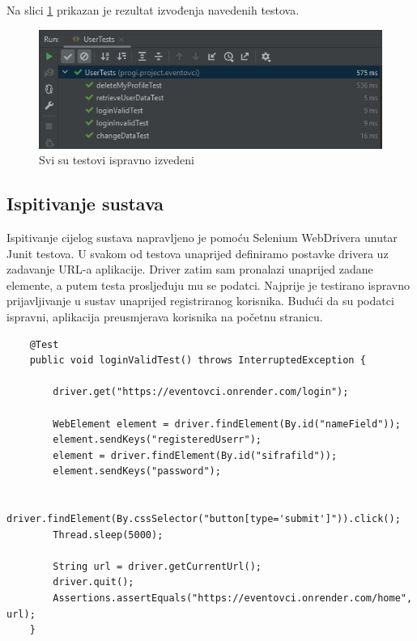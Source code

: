 			Na slici \ref{komp} prikazan je rezultat izvođenja navedenih testova. 
			
			\begin{figure}[H]
				\includegraphics[width=\textwidth]{slike/ispitivanje_komponenti.jpeg} 
				\centering
				\vspace{-0.2cm}
				\caption{Svi su testovi ispravno izvedeni}
				\label{komp}
			\end{figure}
			
			
			\subsection{Ispitivanje sustava}
			
			 Ispitivanje cijelog sustava napravljeno je pomoću Selenium WebDrivera unutar Junit testova. U svakom od testova unaprijed definiramo postavke drivera uz zadavanje URL-a aplikacije. Driver zatim sam pronalazi unaprijed zadane elemente, a putem testa prosljeđuju mu se podatci. Najprije je testirano ispravno prijavljivanje u sustav unaprijed registriranog korisnika. Budući da su podatci ispravni, aplikacija preusmjerava korisnika na početnu stranicu.
			 
\begin{lstlisting}
	@Test
	public void loginValidTest() throws InterruptedException {
		
		driver.get("https://eventovci.onrender.com/login");
		
		WebElement element = driver.findElement(By.id("nameField"));
		element.sendKeys("registeredUserr");
		element = driver.findElement(By.id("sifrafild"));
		element.sendKeys("password");
		
		driver.findElement(By.cssSelector("button[type='submit']")).click();
		Thread.sleep(5000);
		
		String url = driver.getCurrentUrl();
		driver.quit();
		Assertions.assertEquals("https://eventovci.onrender.com/home", url);
	}
	
\end{lstlisting}

